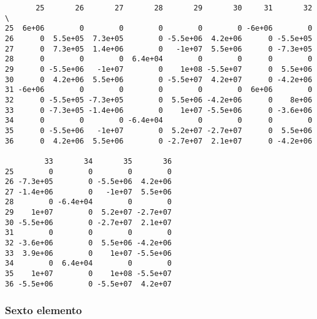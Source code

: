 \documentclass{article}
\begin{document}
    
    \begin{verbatim}
       25       26       27       28       29       30     31       32  \
25  6e+06        0        0        0        0        0 -6e+06        0   
26      0  5.5e+05  7.3e+05        0 -5.5e+06  4.2e+06      0 -5.5e+05   
27      0  7.3e+05  1.4e+06        0   -1e+07  5.5e+06      0 -7.3e+05   
28      0        0        0  6.4e+04        0        0      0        0   
29      0 -5.5e+06   -1e+07        0    1e+08 -5.5e+07      0  5.5e+06   
30      0  4.2e+06  5.5e+06        0 -5.5e+07  4.2e+07      0 -4.2e+06   
31 -6e+06        0        0        0        0        0  6e+06        0   
32      0 -5.5e+05 -7.3e+05        0  5.5e+06 -4.2e+06      0    8e+06   
33      0 -7.3e+05 -1.4e+06        0    1e+07 -5.5e+06      0 -3.6e+06   
34      0        0        0 -6.4e+04        0        0      0        0   
35      0 -5.5e+06   -1e+07        0  5.2e+07 -2.7e+07      0  5.5e+06   
36      0  4.2e+06  5.5e+06        0 -2.7e+07  2.1e+07      0 -4.2e+06   

         33       34       35       36  
25        0        0        0        0  
26 -7.3e+05        0 -5.5e+06  4.2e+06  
27 -1.4e+06        0   -1e+07  5.5e+06  
28        0 -6.4e+04        0        0  
29    1e+07        0  5.2e+07 -2.7e+07  
30 -5.5e+06        0 -2.7e+07  2.1e+07  
31        0        0        0        0  
32 -3.6e+06        0  5.5e+06 -4.2e+06  
33  3.9e+06        0    1e+07 -5.5e+06  
34        0  6.4e+04        0        0  
35    1e+07        0    1e+08 -5.5e+07  
36 -5.5e+06        0 -5.5e+07  4.2e+07  
    \end{verbatim}

    
    \subsubsection{Sexto elemento}\label{sexto-elemento}
\end{document}
